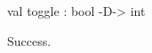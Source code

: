 \chklistingtrue
{}
\begin{ChkListingMsg}
val toggle : bool -D-> int 
\end{ChkListingMsg}
\begin{ChkListingErr}
Success.
\end{ChkListingErr}

